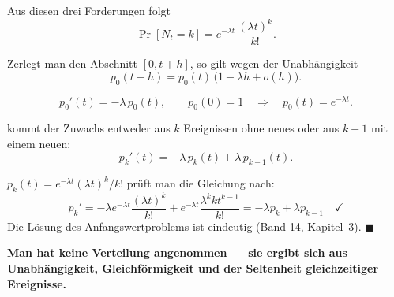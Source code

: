 \begin{merksatz}
Aus diesen drei Forderungen folgt
\[ \Pr[N_t = k] = e^{-\lambda t}\,\frac{(\lambda t)^{k}}{k!} . \]

 Zerlegt man den Abschnitt $[0, t+h]$, so gilt wegen der Unabhängigkeit
\[ p_0(t+h) = p_0(t)\,\bigl(1 - \lambda h + o(h)\bigr) . \]

\[ p_0'(t) = -\lambda\,p_0(t), \qquad p_0(0)=1 \quad\Longrightarrow\quad p_0(t) = e^{-\lambda t} . \]

 kommt der Zuwachs entweder aus $k$ Ereignissen ohne neues oder aus $k-1$ mit einem neuen:
\[ p_k'(t) = -\lambda\,p_k(t) + \lambda\,p_{k-1}(t) . \]

 $p_k(t) = e^{-\lambda t}(\lambda t)^k/k!$ prüft man die Gleichung nach:
\[ p_k' = -\lambda e^{-\lambda t}\frac{(\lambda t)^k}{k!} + e^{-\lambda t}\frac{\lambda^k k t^{k-1}}{k!} = -\lambda p_k + \lambda p_{k-1} \quad \checkmark \]
Die Lösung des Anfangswertproblems ist eindeutig (Band 14, Kapitel~3). $\blacksquare$

\begin{center}
\begin{minipage}{0.9\textwidth}
\textbf{Man hat keine Verteilung angenommen --- sie ergibt sich aus Unabhängigkeit, Gleichförmigkeit und der Seltenheit gleichzeitiger Ereignisse.}
\end{minipage}
\end{center}
\end{merksatz}

